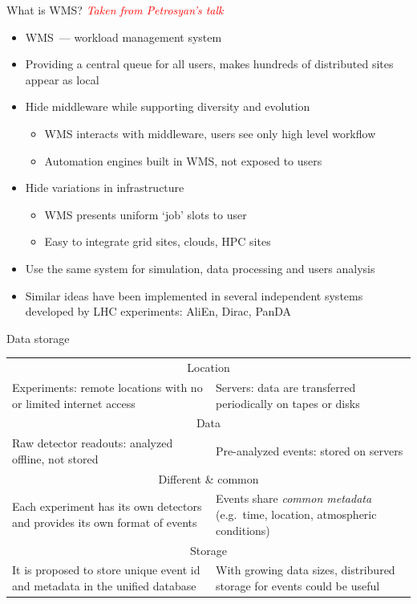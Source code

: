 \documentclass[18pt]{beamer}
\begin{document}
\begin{frame}{What is WMS?}
\textcolor{red}{\textit{Taken from Petrosyan's talk}}
\begin{itemize}
  \item WMS~--- workload management system
  \item Providing a central queue for all users, makes hundreds of distributed sites appear as local
  \item Hide middleware while supporting diversity and evolution
  \begin{itemize}
    \item WMS interacts with middleware, users see only high level workflow
    \item Automation engines built in WMS, not exposed to users
  \end{itemize}
  \item Hide variations in infrastructure
  \begin{itemize}
    \item WMS presents uniform ‘job’ slots to user
    \item Easy to integrate grid sites, clouds, HPC sites
  \end{itemize}
  \item Use the same system for simulation, data processing and users analysis
  \item Similar ideas have been implemented in several independent systems developed by LHC experiments: AliEn, Dirac, PanDA
\end{itemize}
\end{frame}

\begin{frame}{Data storage}
\begin{tabular*}{1\textwidth}{p{}@{\extracolsep{\fill}}p{}}
\hline\multicolumn{2}{c}{Location} \\
Experiments: remote locations with no or limited internet access &
Servers: data are transferred periodically on tapes or disks \\
\hline\multicolumn{2}{c}{Data} \\
Raw detector readouts: analyzed offline, not stored &
Pre-analyzed events: stored on servers \\
\hline\multicolumn{2}{c}{Different \& common} \\
Each experiment has its own detectors and provides its own format of events &
Events share \emph{common metadata} (e.g.\ time, location, atmospheric conditions) \\
\hline\multicolumn{2}{c}{Storage} \\
It is proposed to store unique event id and metadata in the unified database &
With growing data sizes, distribured storage for events could be useful \\
\hline
\end{tabular*}
\end{frame}
\end{document}
